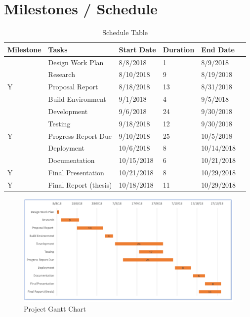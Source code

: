 \documentclass[12pt]{article}
\begin{document}
\section{Milestones / Schedule}
\begin{table}[H]
\centering
	 \begin{tabular}{ | p{2cm}<{\centering} | p{4cm}<{\centering}|p{3cm}<{\centering}| p{2cm}<{\centering} | p{2cm}<{\centering} | p{2cm}<{\centering} |}
	\hline
	\textbf{Milestone} & \textbf{Tasks} & \textbf{Start Date} &\textbf{Duration} &\textbf{End Date} 
	\\ \hline
	&Design Work Plan & 8/8/2018 &1& 8/9/2018
 	\\ \hline
	&Research & 8/10/2018 & 9 & 8/19/2018
	\\ \hline
	Y&Proposal Report&8/18/2018&13&8/31/2018
	\\ \hline
	&Build Environment&9/1/2018&4&9/5/2018
	\\ \hline
	&Development&9/6/2018&24&9/30/2018
\\ \hline
	&Testing&9/18/2018&12&9/30/2018
	\\ \hline
	Y&Progress Report Due&9/10/2018&25&10/5/2018
\\ \hline
	&Deployment&10/6/2018&8&10/14/2018
	\\ \hline
	&Documentation&10/15/2018&6&10/21/2018
	\\ \hline
	Y&Final Presentation&10/21/2018&8&10/29/2018
\\ \hline
	Y&Final Report (thesis)&10/18/2018&11&10/29/2018
\\ \hline
	\end{tabular}
	\caption{Schedule Table}
\end{table}


\begin{figure}[H] 
\centering\includegraphics[width=12cm]{GanttChart} 
\caption{Project Gantt Chart}
\end{figure}  
\end{document}
